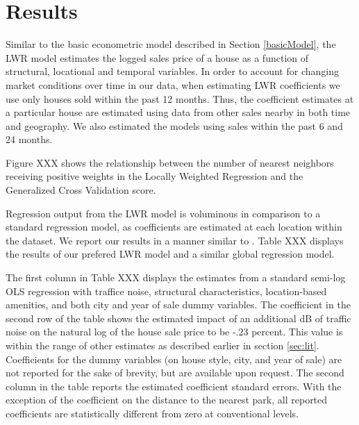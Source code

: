 \documentclass{article}\usepackage{graphicx, color}
\begin{document}
\section{Results}
Similar to the basic econometric model described in Section \ref{basicModel}, the LWR model estimates the logged sales price of a house as a function of structural, locational and temporal variables. In order to account for changing market conditions over time in our data, when estimating LWR coefficients we use only houses sold within the past 12 months. Thus, the coefficient estimates at a particular house are estimated using data from other sales nearby in both time and geography. We also estimated the models using sales within the past 6 and 24 months. 

Figure XXX shows the relationship between the number of nearest neighbors receiving positive weights in the Locally Weighted Regression and the Generalized Cross Validation score. 

Regression output from the LWR model is voluminous in comparison to a standard regression model, as coefficients are estimated at each location within the dataset. We report our results in a manner similar to \citet{MarmolejoDuarteCarlos;GonzalezTamez2009}. Table XXX displays the results of our prefered LWR model and a similar global regression model.



The first column in Table XXX displays the estimates from a standard semi-log OLS regression with traffice noise, structural characteristics, location-based amenities, and both city and year of sale dummy variables. The coefficient in the second row of the table shows the estimated impact of an additional dB of traffic noise on the natural log of the house sale price to be -.23 percent. This value is within the range of other estimates as described earlier in section \ref{sec:lit}. Coefficients for the dummy variables (on house style, city, and year of sale) are not reported for the sake of brevity, but are available upon request. The second column in the table reports the estimated coefficient standard errors. With the exception of the coefficient on the distance to the nearest park, all reported coefficients are statistically different from zero at conventional levels. 
\end{document}
